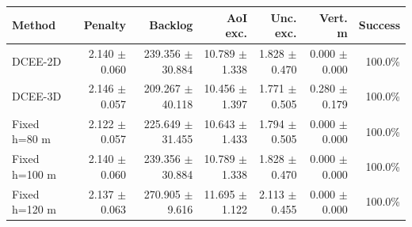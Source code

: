 \begin{tabular}{lrrrrrr}
\toprule
Method & Penalty & Backlog & AoI exc. & Unc. exc. & Vert. m & Success \\
\midrule
DCEE-2D & 2.140 $\pm$ 0.060 & 239.356 $\pm$ 30.884 & 10.789 $\pm$ 1.338 & 1.828 $\pm$ 0.470 & 0.000 $\pm$ 0.000 & 100.0\% \\
DCEE-3D & 2.146 $\pm$ 0.057 & 209.267 $\pm$ 40.118 & 10.456 $\pm$ 1.397 & 1.771 $\pm$ 0.505 & 0.280 $\pm$ 0.179 & 100.0\% \\
Fixed h=80 m & 2.122 $\pm$ 0.057 & 225.649 $\pm$ 31.455 & 10.643 $\pm$ 1.433 & 1.794 $\pm$ 0.505 & 0.000 $\pm$ 0.000 & 100.0\% \\
Fixed h=100 m & 2.140 $\pm$ 0.060 & 239.356 $\pm$ 30.884 & 10.789 $\pm$ 1.338 & 1.828 $\pm$ 0.470 & 0.000 $\pm$ 0.000 & 100.0\% \\
Fixed h=120 m & 2.137 $\pm$ 0.063 & 270.905 $\pm$ 9.616 & 11.695 $\pm$ 1.122 & 2.113 $\pm$ 0.455 & 0.000 $\pm$ 0.000 & 100.0\% \\
\bottomrule
\end{tabular}
